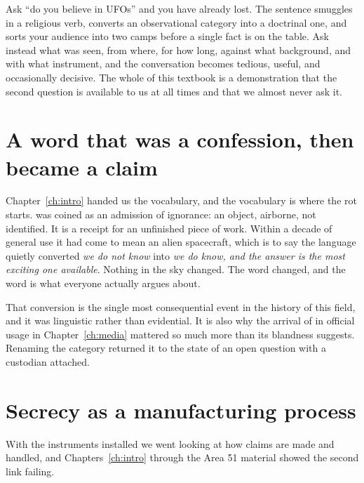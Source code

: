 Ask ``do you believe in UFOs'' and you have already lost. The sentence smuggles
in a religious verb, converts an observational category into a doctrinal one,
and sorts your audience into two camps before a single fact is on the table. Ask
instead what was seen, from where, for how long, against what background, and
with what instrument, and the conversation becomes tedious, useful, and
occasionally decisive. The whole of this textbook is a demonstration that the
second question is available to us at all times and that we almost never ask it.

\section*{A word that was a confession, then became a claim}

Chapter~\ref{ch:intro} handed us the vocabulary, and the vocabulary is where the
rot starts.  was coined as an admission of ignorance: an object,
airborne, not identified. It is a receipt for an unfinished piece of work. Within
a decade of general use it had come to mean an alien spacecraft, which is to say
the language quietly converted \emph{we do not know} into \emph{we do know, and
the answer is the most exciting one available}. Nothing in the sky changed. The
word changed, and the word is what everyone actually argues about.

That conversion is the single most consequential event in the history of this
field, and it was linguistic rather than evidential. It is also why the arrival
of  in official usage in Chapter~\ref{ch:media} mattered so much more
than its blandness suggests. Renaming the category returned it to the state of
an open question with a custodian attached. 

\section*{Secrecy as a manufacturing process}

With the instruments installed we went looking at how claims are made and
handled, and Chapters~\ref{ch:intro} through the Area 51 material showed the
second link failing.


